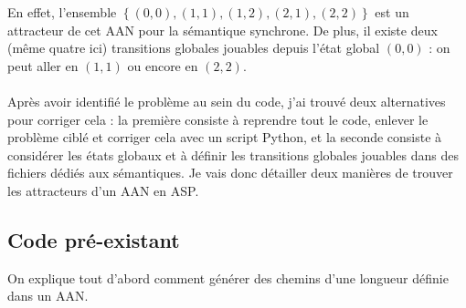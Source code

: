\documentclass[10pt,a4paper]{article}
\begin{document}
En effet, l'ensemble $\left\{(0,0),(1,1),(1,2),(2,1),(2,2)\right\}$ est un attracteur de cet AAN pour la sémantique synchrone. De plus, il existe deux (même quatre ici) transitions globales jouables depuis l'état global $(0,0)$ : 
on peut aller en $(1,1)$ ou encore en $(2,2)$.\\ \\
Après avoir identifié le problème au sein du code, j'ai trouvé deux alternatives pour corriger cela : la première consiste à reprendre tout le code, enlever le problème ciblé et corriger cela avec un script Python, et la seconde 
consiste à considérer les états globaux et à définir les transitions globales jouables dans des fichiers dédiés aux sémantiques. Je vais donc détailler deux manières de trouver les attracteurs d'un AAN en ASP.

\subsection{Code pré-existant}
\hypertarget{preexistante}{On explique tout d'abord comment générer des chemins d'une longueur définie dans un AAN.}\\ \\
\end{document}

